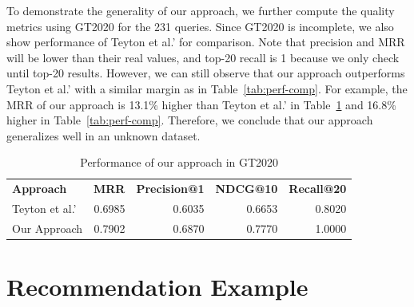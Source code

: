 \documentclass[conference, 10pt]{IEEEtran}
\begin{document}
To demonstrate the generality of our approach, we further compute the quality metrics using GT2020 for the 231 queries.
Since GT2020 is incomplete, we also show performance of Teyton et al.' for comparison.
Note that precision and MRR will be lower than their real values, and top-20 recall is 1 because we only check until top-20 results. 
However, we can still observe that our approach outperforms Teyton et al.' with a similar margin as in Table~\ref{tab:perf-comp}.
For example, the MRR of our approach is 13.1\% higher than Teyton et al.' in Table~\ref{tab:perf-comp2} and 16.8\% higher in Table~\ref{tab:perf-comp}.
Therefore, we conclude that our approach generalizes well in an unknown dataset.


\begin{table}[]
\caption{Performance of our approach in GT2020}
\centering
\begin{tabular}{|l|r|r|r|r|}
\hline
\textbf{Approach} & \textbf{MRR} & \textbf{Precision@1} & \textbf{NDCG@10} & \textbf{Recall@20}  \\ 
\hhline{|=|=|=|=|=|}
Teyton et al.'  & 0.6985 & 0.6035 & 0.6653 & 0.8020 \\ \hline
Our Approach    & 0.7902 & 0.6870 & 0.7770 & 1.0000 \\ \hline
\end{tabular}
\label{tab:perf-comp2}
\end{table}

\section{Recommendation Example}
\end{document}
